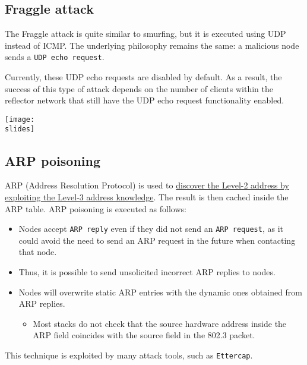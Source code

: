 \subsection{Fraggle attack}



\noindent
\begin{minipage}{0.4\textwidth}
    The Fraggle attack is quite similar to smurfing, but it is executed using UDP instead of ICMP. The underlying philosophy remains the same: a malicious node sends a \texttt{UDP echo request}.

    Currently, these UDP echo requests are disabled by default. As a result, the success of this type of attack depends on the number of clients within the reflector network that still have the UDP echo request functionality enabled.
\end{minipage}
\hspace{0.05\textwidth}
\begin{minipage}{0.5\textwidth}
    \centering
    \texttt{[image: \\slides]}
\end{minipage}

\subsection{ARP poisoning}
ARP (Address Resolution Protocol) is used to \ul{discover the Level-2 address by exploiting the Level-3 address knowledge}. The result is then cached inside the ARP table. ARP poisoning is executed as follows:
\begin{itemize}
    \item Nodes accept \texttt{ARP reply} even if they did not send an \texttt{ARP request}, as it could avoid the need to send an ARP request in the future when contacting that node.
    \item Thus, it is possible to send unsolicited incorrect ARP replies to nodes.
    \item Nodes will overwrite static ARP entries with the dynamic ones obtained from ARP replies.
          \begin{itemize}
              \item Most stacks do not check that the source hardware address inside the ARP field coincides with the source field in the 802.3 packet.
          \end{itemize}
\end{itemize}
This technique is exploited by many attack tools, such as \texttt{Ettercap}.



